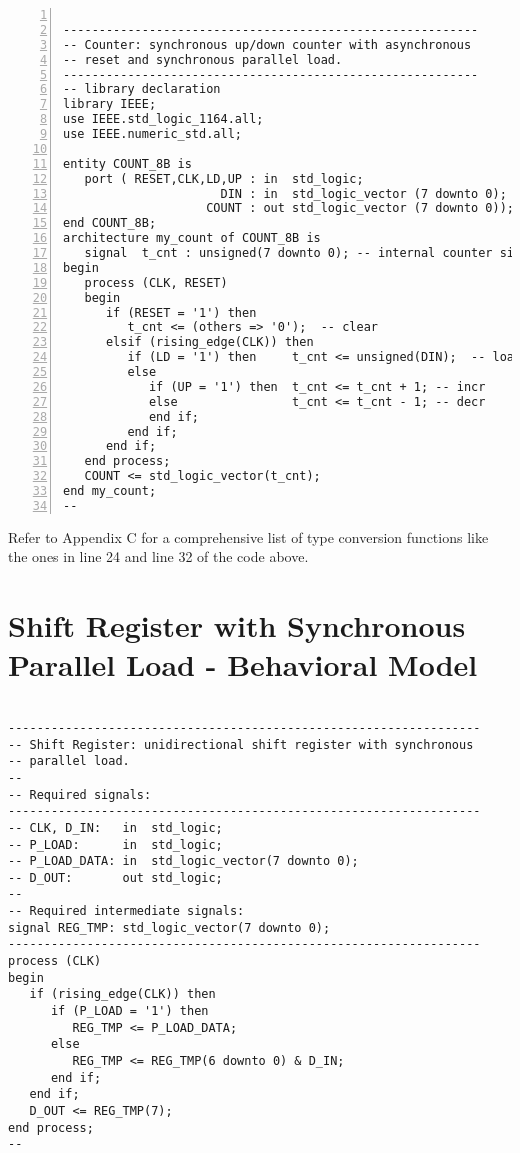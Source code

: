 \noindent
\begin{minipage}{0.99\linewidth}
\begin{lstlisting}[numbers=left]

----------------------------------------------------------
-- Counter: synchronous up/down counter with asynchronous 
-- reset and synchronous parallel load. 
----------------------------------------------------------
-- library declaration
library IEEE;
use IEEE.std_logic_1164.all;
use IEEE.numeric_std.all;

entity COUNT_8B is
   port ( RESET,CLK,LD,UP : in  std_logic; 
                      DIN : in  std_logic_vector (7 downto 0); 
                    COUNT : out std_logic_vector (7 downto 0)); 
end COUNT_8B; 
architecture my_count of COUNT_8B is 
   signal  t_cnt : unsigned(7 downto 0); -- internal counter signal
begin          
   process (CLK, RESET) 
   begin
      if (RESET = '1') then    
         t_cnt <= (others => '0');  -- clear
      elsif (rising_edge(CLK)) then
         if (LD = '1') then     t_cnt <= unsigned(DIN);  -- load
         else 
            if (UP = '1') then  t_cnt <= t_cnt + 1; -- incr
            else                t_cnt <= t_cnt - 1; -- decr
            end if;
         end if;
      end if;
   end process;
   COUNT <= std_logic_vector(t_cnt); 
end my_count;
--
\end{lstlisting}
\end{minipage}

Refer to Appendix C for a comprehensive list of type conversion functions like the ones in line 24 and line 32 of the code above. 

\section{Shift Register with Synchronous Parallel Load - Behavioral Model}

\noindent
\begin{minipage}{0.99\linewidth}
\begin{lstlisting}

------------------------------------------------------------------
-- Shift Register: unidirectional shift register with synchronous 
-- parallel load. 
-- 
-- Required signals: 
------------------------------------------------------------------
-- CLK, D_IN:   in  std_logic;
-- P_LOAD:      in  std_logic;
-- P_LOAD_DATA: in  std_logic_vector(7 downto 0);
-- D_OUT:       out std_logic; 
-- 
-- Required intermediate signals: 
signal REG_TMP: std_logic_vector(7 downto 0);
------------------------------------------------------------------
process (CLK)
begin
   if (rising_edge(CLK)) then
      if (P_LOAD = '1') then
         REG_TMP <= P_LOAD_DATA;
      else
         REG_TMP <= REG_TMP(6 downto 0) & D_IN;
      end if;
   end if;
   D_OUT <= REG_TMP(7);
end process;
--
\end{lstlisting}
\end{minipage}

